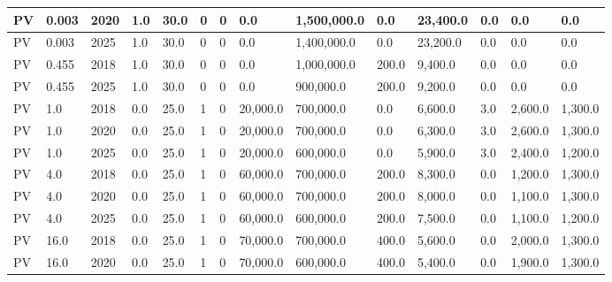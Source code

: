 \documentclass[sigconf]{acmart}
\begin{document}
\begin{table*}[]
\begin{tabularx}{\linewidth}{|p{}|l|x|l|l|l|l|l|l|l|l|l|l|l|}
PV                            & 0.003       & 2020             & 1.0    & 30.0 & 0     & 0     & 0.0       & 1,500,000.0 & 0.0       & 23,400.0 & 0.0   & 0.0      & 0.0       \\ \hline
PV                            & 0.003       & 2025             & 1.0    & 30.0 & 0     & 0     & 0.0       & 1,400,000.0 & 0.0       & 23,200.0 & 0.0   & 0.0      & 0.0       \\ \hline
PV                            & 0.455       & 2018             & 1.0    & 30.0 & 0     & 0     & 0.0       & 1,000,000.0 & 200.0     & 9,400.0  & 0.0   & 0.0      & 0.0       \\ \hline
PV                            & 0.455       & 2025             & 1.0    & 30.0 & 0     & 0     & 0.0       & 900,000.0   & 200.0     & 9,200.0  & 0.0   & 0.0      & 0.0       \\ \hline
PV                            & 1.0         & 2018             & 0.0    & 25.0 & 1     & 0     & 20,000.0  & 700,000.0   & 0.0       & 6,600.0  & 3.0   & 2,600.0  & 1,300.0   \\ \hline
PV                            & 1.0         & 2020             & 0.0    & 25.0 & 1     & 0     & 20,000.0  & 700,000.0   & 0.0       & 6,300.0  & 3.0   & 2,600.0  & 1,300.0   \\ \hline
PV                            & 1.0         & 2025             & 0.0    & 25.0 & 1     & 0     & 20,000.0  & 600,000.0   & 0.0       & 5,900.0  & 3.0   & 2,400.0  & 1,200.0   \\ \hline
PV                            & 4.0         & 2018             & 0.0    & 25.0 & 1     & 0     & 60,000.0  & 700,000.0   & 200.0     & 8,300.0  & 0.0   & 1,200.0  & 1,300.0   \\ \hline
PV                            & 4.0         & 2020             & 0.0    & 25.0 & 1     & 0     & 60,000.0  & 700,000.0   & 200.0     & 8,000.0  & 0.0   & 1,100.0  & 1,300.0   \\ \hline
PV                            & 4.0         & 2025             & 0.0    & 25.0 & 1     & 0     & 60,000.0  & 600,000.0   & 200.0     & 7,500.0  & 0.0   & 1,100.0  & 1,200.0   \\ \hline
PV                            & 16.0        & 2018             & 0.0    & 25.0 & 1     & 0     & 70,000.0  & 700,000.0   & 400.0     & 5,600.0  & 0.0   & 2,000.0  & 1,300.0   \\ \hline
PV                            & 16.0        & 2020             & 0.0    & 25.0 & 1     & 0     & 70,000.0  & 600,000.0   & 400.0     & 5,400.0  & 0.0   & 1,900.0  & 1,300.0   \\ \hline

\end{tabularx}
\end{table*}
\end{document}
